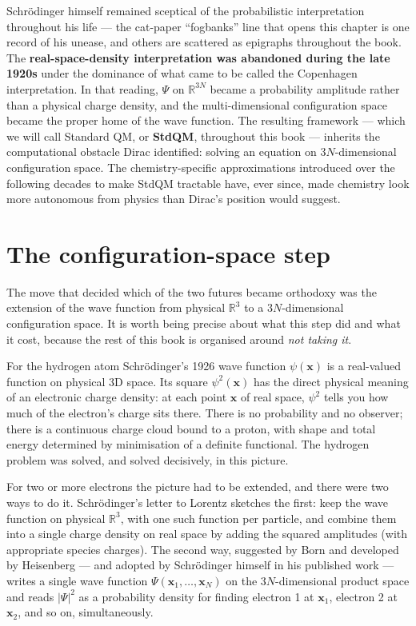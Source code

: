 Schr\"odinger himself remained sceptical of the probabilistic interpretation throughout his life --- the cat-paper ``fogbanks'' line that opens this chapter is one record of his unease, and others are scattered as epigraphs throughout the book. The \textbf{real-space-density interpretation was abandoned during the late 1920s} under the dominance of what came to be called the Copenhagen interpretation. In that reading, $\Psi$ on $\mathbb{R}^{3N}$ became a probability amplitude rather than a physical charge density, and the multi-dimensional configuration space became the proper home of the wave function. The resulting framework --- which we will call Standard QM, or \textbf{StdQM}, throughout this book --- inherits the computational obstacle Dirac identified: solving an equation on $3N$-dimensional configuration space. The chemistry-specific approximations introduced over the following decades to make StdQM tractable have, ever since, made chemistry look more autonomous from physics than Dirac's position would suggest.

\section{The configuration-space step}\label{sec:configuration-space}

The move that decided which of the two futures became orthodoxy was the extension of the wave function from physical $\mathbb{R}^3$ to a $3N$-dimensional configuration space. It is worth being precise about what this step did and what it cost, because the rest of this book is organised around \emph{not taking it}.

For the hydrogen atom Schr\"odinger's 1926 wave function $\psi(\mathbf{x})$ is a real-valued function on physical 3D space. Its square $\psi^2(\mathbf{x})$ has the direct physical meaning of an electronic charge density: at each point $\mathbf{x}$ of real space, $\psi^2$ tells you how much of the electron's charge sits there. There is no probability and no observer; there is a continuous charge cloud bound to a proton, with shape and total energy determined by minimisation of a definite functional. The hydrogen problem was solved, and solved decisively, in this picture.

For two or more electrons the picture had to be extended, and there were two ways to do it. Schr\"odinger's letter to Lorentz sketches the first: keep the wave function on physical $\mathbb{R}^3$, with one such function per particle, and combine them into a single charge density on real space by adding the squared amplitudes (with appropriate species charges). The second way, suggested by Born and developed by Heisenberg --- and adopted by Schr\"odinger himself in his published work --- writes a single wave function $\Psi(\mathbf{x}_1, \ldots, \mathbf{x}_N)$ on the $3N$-dimensional product space and reads $|\Psi|^2$ as a probability density for finding electron 1 at $\mathbf{x}_1$, electron 2 at $\mathbf{x}_2$, and so on, simultaneously.

